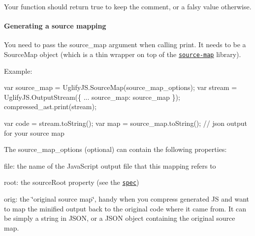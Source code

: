 Your function should return {\ttfamily true} to keep the comment, or a falsy value otherwise.

\paragraph*{Generating a source mapping}

You need to pass the {\ttfamily source\+\_\+map} argument when calling {\ttfamily print}. It needs to be a {\ttfamily Source\+Map} object (which is a thin wrapper on top of the \href{https://github.com/mozilla/source-map}{\tt source-\/map} library).

Example\+: 
\begin{DoxyCode}
var source\_map = UglifyJS.SourceMap(source\_map\_options);
var stream = UglifyJS.OutputStream(\{
    ...
    source\_map: source\_map
\});
compressed\_ast.print(stream);

var code = stream.toString();
var map = source\_map.toString(); // json output for your source map
\end{DoxyCode}


The {\ttfamily source\+\_\+map\+\_\+options} (optional) can contain the following properties\+:


\begin{DoxyItemize}
\item {\ttfamily file}\+: the name of the Java\+Script output file that this mapping refers to
\item {\ttfamily root}\+: the {\ttfamily source\+Root} property (see the \href{https://docs.google.com/document/d/1U1RGAehQwRypUTovF1KRlpiOFze0b-_2gc6fAH0KY0k/edit}{\tt spec})
\item {\ttfamily orig}\+: the \char`\"{}original source map\char`\"{}, handy when you compress generated JS and want to map the minified output back to the original code where it came from. It can be simply a string in J\+S\+ON, or a J\+S\+ON object containing the original source map. 
\end{DoxyItemize}